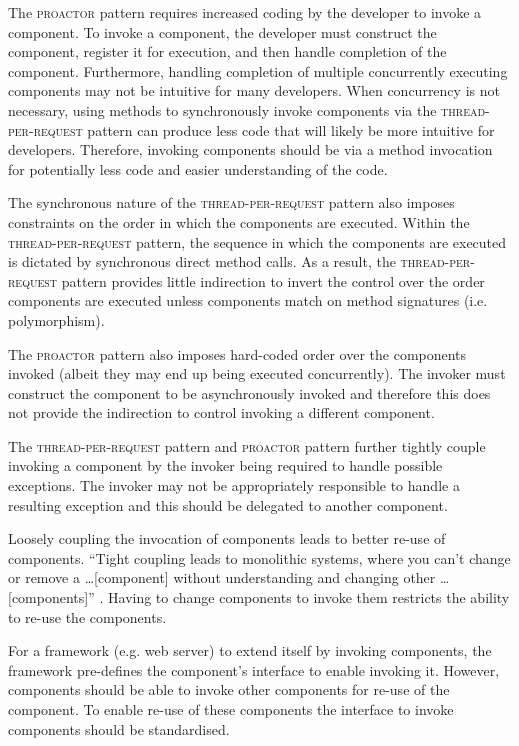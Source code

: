 \documentclass[prodmode]{style/acmlarge}
\begin{document}
The \textsc{proactor} pattern requires increased coding by the developer to
invoke a component.  To invoke a component, the developer must construct the
component, register it for execution, and then handle completion of the
component.  Furthermore, handling completion of multiple concurrently executing
components may not be intuitive for many developers.  When concurrency is not
necessary, using methods to synchronously invoke components via the
\textsc{thread-per-request} pattern can produce less code that will likely be
more intuitive for developers.  Therefore, invoking components should be via a
method invocation for potentially less code and easier understanding of the
code.

The synchronous nature of the \textsc{thread-per-request} pattern also imposes
constraints on the order in which the components are executed.  Within the
\textsc{thread-per-request} pattern, the sequence in which the components are
executed is dictated by synchronous direct method calls.  As a result, the
\textsc{thread-per-request} pattern provides little indirection to invert the
control over the order components are executed unless components match on method
signatures (i.e. polymorphism).

The \textsc{proactor} pattern also imposes hard-coded order over the components
invoked (albeit they may end up being executed concurrently).  The invoker must
construct the component to be asynchronously invoked and therefore this does not
provide the indirection to control invoking a different component.

The \textsc{thread-per-request} pattern and \textsc{proactor} pattern further
tightly couple invoking a component by the invoker being required to handle
possible exceptions.  The invoker may not be appropriately responsible to handle
a resulting exception and this should be delegated to another component.

Loosely coupling the invocation of components leads to better re-use of
components.  ``Tight coupling leads to monolithic systems, where you can't
change or remove a \ldots [component] without understanding and changing other
\ldots [components]'' \cite[p. 24-25]{gof}.  Having to change components to
invoke them restricts the ability to re-use the components.

For a framework (e.g. web server) to extend itself by invoking components, the
framework pre-defines the component's interface to enable invoking it.  However,
components should be able to invoke other components for re-use of the
component.  To enable re-use of these components the interface to invoke
components should be standardised.
\end{document}
